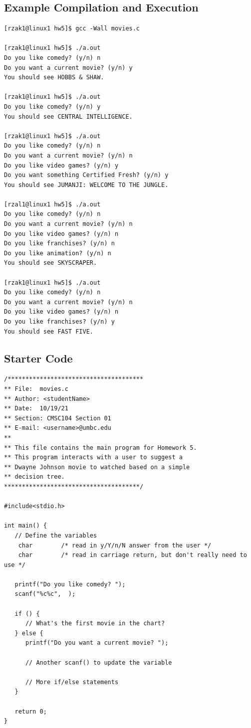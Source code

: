 \documentclass[letter,11pt]{article}
\begin{document}
\subsection*{Example Compilation and Execution}
\begin{verbatim}
[rzak1@linux1 hw5]$ gcc -Wall movies.c

[rzak1@linux1 hw5]$ ./a.out
Do you like comedy? (y/n) n
Do you want a current movie? (y/n) y
You should see HOBBS & SHAW.

[rzak1@linux1 hw5]$ ./a.out
Do you like comedy? (y/n) y
You should see CENTRAL INTELLIGENCE.

[rzak1@linux1 hw5]$ ./a.out
Do you like comedy? (y/n) n
Do you want a current movie? (y/n) n
Do you like video games? (y/n) y
Do you want something Certified Fresh? (y/n) y
You should see JUMANJI: WELCOME TO THE JUNGLE.

[rzal1@linux1 hw5]$ ./a.out
Do you like comedy? (y/n) n
Do you want a current movie? (y/n) n
Do you like video games? (y/n) n
Do you like franchises? (y/n) n
Do you like animation? (y/n) n
You should see SKYSCRAPER.

[rzak1@linux1 hw5]$ ./a.out
Do you like comedy? (y/n) n
Do you want a current movie? (y/n) n
Do you like video games? (y/n) n
Do you like franchises? (y/n) y
You should see FAST FIVE.
\end{verbatim}

\subsection*{Starter Code}
\begin{verbatim}
/**************************************
** File:  movies.c
** Author: <studentName>
** Date:  10/19/21
** Section: CMSC104 Section 01
** E-mail: <username>@umbc.edu
**
** This file contains the main program for Homework 5.
** This program interacts with a user to suggest a
** Dwayne Johnson movie to watched based on a simple
** decision tree.
**************************************/

#include<stdio.h>

int main() {
   // Define the variables
    char        /* read in y/Y/n/N answer from the user */
    char        /* read in carriage return, but don't really need to use */

   printf("Do you like comedy? ");
   scanf("%c%c",  );

   if () {
      // What's the first movie in the chart?
   } else {
      printf("Do you want a current movie? ");
      
      // Another scanf() to update the variable

      // More if/else statements
   }

   return 0;
}
\end{verbatim}
\end{document}
